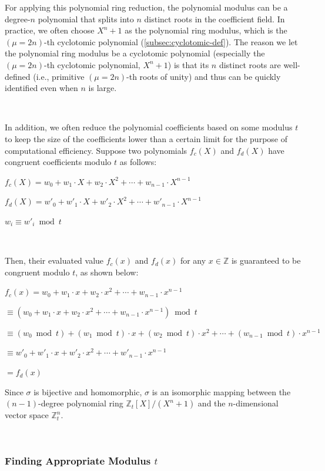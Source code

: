 For applying this polynomial ring reduction, the polynomial modulus can be a degree-$n$ polynomial that splits into $n$ distinct roots in the coefficient field. In practice, we often choose $X^n + 1$ as the polynomial ring modulus, which is the $(\mu=2n)$-th cyclotomic polynomial (\autoref{subsec:cyclotomic-def}). The reason we let the polynomial ring modulus be a cyclotomic polynomial (especially the $(\mu=2n)$-th cyclotomic polynomial, $X^n + 1$) is that its $n$ distinct roots are well-defined (i.e., primitive $(\mu=2n)$-th roots of unity) and thus can be quickly identified even when $n$ is large.

$ $

 In addition, we often reduce the polynomial coefficients based on some modulus $t$ to keep the size of the coefficients lower than a certain limit for the purpose of computational efficiency. Suppose two polynomials $f_c(X)$ and $f_d(X)$ have congruent coefficients modulo $t$ as follows:

$f_c(X) = w_0 + w_1\cdot X + w_2\cdot X^2 + \cdots + w_{n-1}\cdot X^{n-1}$

$f_d(X) = w'_0 + w'_1\cdot X + w'_2\cdot X^2 + \cdots + w'_{n-1}\cdot X^{n-1} $

$w_i \equiv w'_i \bmod t$

$ $

Then, their evaluated value $f_c(x)$ and $f_d(x)$ for any $x \in \mathbb{Z}$ is guaranteed to be congruent modulo $t$, as shown below:

$f_c(x) = w_0 + w_1\cdot x + w_2\cdot x^2 + \cdots + w_{n-1}\cdot x^{n-1}$

$\equiv (w_0 + w_1\cdot x + w_2\cdot x^2 + \cdots + w_{n-1}\cdot x^{n-1}) \bmod t $

$\equiv (w_0  \bmod t) + (w_1  \bmod t)\cdot x + (w_2  \bmod t)\cdot x^2 + \cdots + (w_{n-1} \bmod t)\cdot x^{n-1} $

$\equiv w'_0 + w'_1\cdot x + w'_2\cdot x^2 + \cdots + w'_{n-1}\cdot x^{n-1} $

$= f_d(x)$

 Since $\sigma$ is bijective and homomorphic, $\sigma$ is an isomorphic mapping between the $(n-1)$-degree polynomial ring $\mathbb{Z}_t[X]/(X^n + 1)$ and the $n$-dimensional vector space $\mathbb{Z}_t^n$. 


$ $


\subsubsection{Finding Appropriate Modulus $t$} 
\label{subsubsec:poly-vector-transformation-modulus}

